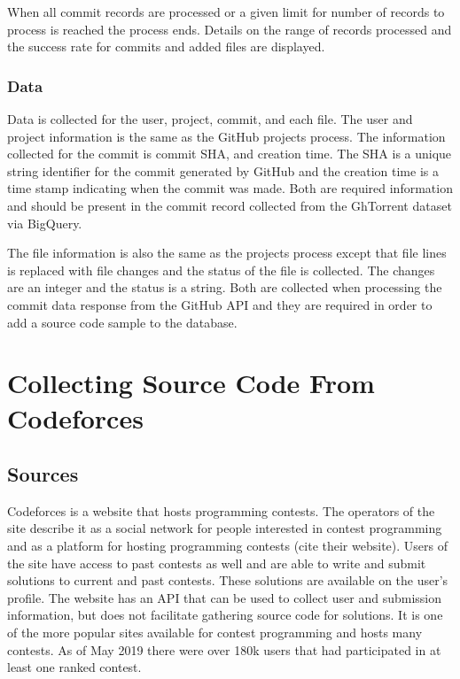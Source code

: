 \documentclass{article}
\begin{document}
When all commit records are processed or a given limit for number of records to process is reached the process ends. Details on the range of records processed and the success rate for commits and added files are displayed.

\subsubsection*{Data}
Data is collected for the user, project, commit, and each file. The user and project information is the same as the GitHub projects process. The information collected for the commit is commit SHA, and creation time. The SHA is a unique string identifier for the commit generated by GitHub and the creation time is a time stamp indicating when the commit was made. Both are required information and should be present in the commit record collected from the GhTorrent dataset via BigQuery.

The file information is also the same as the projects process except that file lines is replaced with file changes and the status of the file is collected. The changes are an integer and the status is a string. Both are collected when processing the commit data response from the GitHub API and they are required in order to add a source code sample to the database.



\section{Collecting Source Code From Codeforces}


\subsection{Sources}
Codeforces is a website that hosts programming contests. The operators of the site describe it as a social network for people interested in contest programming and as a platform for hosting programming contests (cite their website). Users of the site have access to past contests as well and are able to write and submit solutions to current and past contests. These solutions are available on the user's profile. The website has an API that can be used to collect user and submission information, but does not facilitate gathering source code for solutions. It is one of the more popular sites available for contest programming and hosts many contests. As of May 2019 there were over 180k users that had participated in at least one ranked contest.
\end{document}
